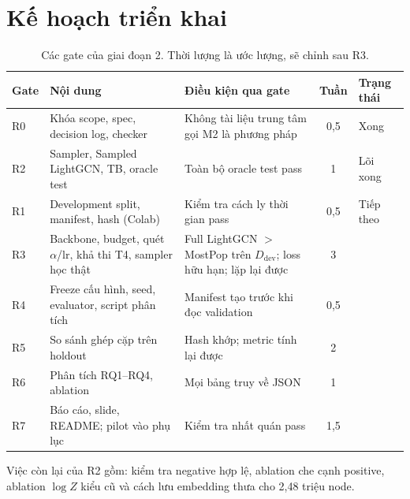 \documentclass[11pt,a4paper]{article}
\begin{document}
\section{Kế hoạch triển khai}
\begin{table}[h]
\centering\small
\caption{Các gate của giai đoạn 2. Thời lượng là ước lượng, sẽ chỉnh sau R3.}\label{tab:plan}
\begin{tabularx}{\linewidth}{lYYcl}
\toprule
Gate & Nội dung & Điều kiện qua gate & Tuần & Trạng thái \\
\midrule
R0 & Khóa scope, spec, decision log, checker & Không tài liệu trung tâm gọi M2 là phương pháp & 0,5 & Xong \\
R2 & Sampler, Sampled LightGCN, TB, oracle test & Toàn bộ oracle test pass & 1 & Lõi xong \\
R1 & Development split, manifest, hash (Colab) & Kiểm tra cách ly thời gian pass & 0,5 & Tiếp theo \\
R3 & Backbone, budget, quét $\alpha$/lr, khả thi T4, sampler học thật & Full LightGCN $>$ MostPop trên $D_{\text{dev}}$; loss hữu hạn; lặp lại được & 3 & \\
R4 & Freeze cấu hình, seed, evaluator, script phân tích & Manifest tạo trước khi đọc validation & 0,5 & \\
R5 & So sánh ghép cặp trên holdout & Hash khớp; metric tính lại được & 2 & \\
R6 & Phân tích RQ1--RQ4, ablation & Mọi bảng truy về JSON & 1 & \\
R7 & Báo cáo, slide, README; pilot vào phụ lục & Kiểm tra nhất quán pass & 1,5 & \\
\bottomrule
\end{tabularx}
\end{table}
Việc còn lại của R2 gồm: kiểm tra negative hợp lệ, ablation che cạnh positive, ablation $\log Z$ kiểu cũ và cách lưu embedding thưa cho 2,48 triệu node.
\end{document}
